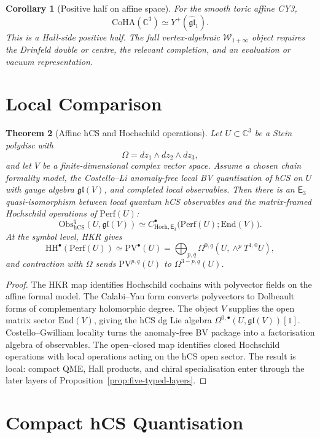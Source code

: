 \documentclass[11pt]{amsart}
\newtheorem{theorem}{Theorem}[section]
\newtheorem{corollary}[theorem]{Corollary}
\theoremstyle{definition}
\theoremstyle{remark}
\providecommand{\Cx}{\mathbb{C}}
\providecommand{\Ethree}{\mathsf{E}_3}
\providecommand{\HH}{\mathrm{HH}}
\providecommand{\PV}{\mathrm{PV}}
\providecommand{\Perf}{\mathrm{Perf}}
\providecommand{\Obs}{\mathrm{Obs}}
\providecommand{\End}{\mathrm{End}}
\providecommand{\CoHA}{\mathrm{CoHA}}
\providecommand{\hCS}{\mathrm{hCS}}
\providecommand{\fgl}{\mathfrak{gl}}
\begin{document}
\begin{corollary}[Positive half on affine space]
\label{cor:c3-positive-half}
For the smooth toric affine CY3,
\[
  \CoHA(\Cx^3)\simeq Y^+(\widehat{\fgl}_1).
\]
This is a Hall-side positive half.  The full vertex-algebraic
$\mathcal W_{1+\infty}$ object requires the Drinfeld double or centre,
the relevant completion, and an evaluation or vacuum representation.
\end{corollary}

\section{Local Comparison}

\begin{theorem}[Affine hCS and Hochschild operations]
\label{thm:local-comparison}
Let $U\subset \Cx^3$ be a Stein polydisc with
\[
  \Omega=dz_1\wedge dz_2\wedge dz_3,
\]
and let $V$ be a finite-dimensional complex vector space.  Assume a
chosen chain formality model, the Costello--Li anomaly-free local BV
quantisation of hCS on $U$ with gauge algebra $\fgl(V)$, and
completed local observables.  Then there is an $\Ethree$ quasi-isomorphism
between local quantum hCS observables and the matrix-framed Hochschild
operations of $\Perf(U)$:
\[
  \Obs^q_{\hCS}(U,\fgl(V))
  \simeq
  C^\bullet_{\mathrm{Hoch},\Ethree}
    \bigl(\Perf(U);\End(V)\bigr).
\]
At the symbol level, HKR gives
\[
  \HH^\bullet(\Perf(U))
  \simeq
  \PV^\bullet(U)
  =
  \bigoplus_{p,q}\Omega^{0,q}(U,\wedge^pT^{1,0}U),
\]
and contraction with $\Omega$ sends $\PV^{p,q}(U)$ to
$\Omega^{3-p,q}(U)$.
\end{theorem}

\begin{proof}
The HKR map identifies Hochschild cochains with polyvector fields on the
affine formal model.  The Calabi--Yau form converts polyvectors to
Dolbeault forms of complementary holomorphic degree.  The object $V$
supplies the open matrix sector $\End(V)$, giving the hCS dg Lie algebra
$\Omega^{0,\bullet}(U,\fgl(V))[1]$.  Costello--Gwilliam locality turns
the anomaly-free BV package into a factorisation algebra of observables.
The open--closed map identifies closed Hochschild operations with local
operations acting on the hCS open sector.  The result is local: compact
QME, Hall products, and chiral specialisation enter through the later
layers of Proposition~\ref{prop:five-typed-layers}.
\end{proof}

\section{Compact hCS Quantisation}
\end{document}
